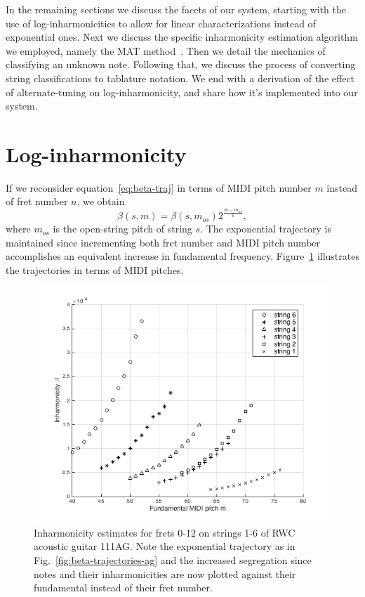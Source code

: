 \documentclass[12pt]{cmuthesis}
\begin{document}
In the remaining sections we discuss the facets of our system, starting with the use of log-inharmonicities to allow for linear characterizations instead of exponential ones. Next we discuss the specific inharmonicity estimation algorithm we employed, namely the MAT method~\cite{hodgkinson2009}. Then we detail the mechanics of classifying an unknown note. Following that, we discuss the process of converting string classifications to tablature notation. We end with a derivation of the effect of alternate-tuning on log-inharmonicity, and share how it's implemented into our system.

\section{Log-inharmonicity}
If we reconsider equation~\eqref{eq:beta-traj} in terms of MIDI pitch number $m$ instead of fret number $n$, we obtain
\begin{equation}
\beta(s,m) = \beta(s,m_{os})2^{\frac{m-m_{os}}{6}},
\end{equation}
where $m_{os}$ is the open-string pitch of string $s$. The exponential trajectory is maintained since incrementing both fret number and MIDI pitch number accomplishes an equivalent increase in fundamental frequency. Figure~\ref{fig:beta-v-midi} illustrates the trajectories in terms of MIDI pitches.

\begin{figure}[h] 
\label{fig:beta-v-midi}
\centering
\includegraphics[scale=0.7]{beta-v-midi}
\caption{Inharmonicity estimates for frets 0-12 on strings 1-6 of RWC acoustic guitar 111AG. Note the exponential trajectory as in Fig.~\ref{fig:beta-trajectories-ag} and the increased segregation since notes and their inharmonicities are now plotted against their fundamental instead of their fret number.}
\end{figure}
\end{document}
